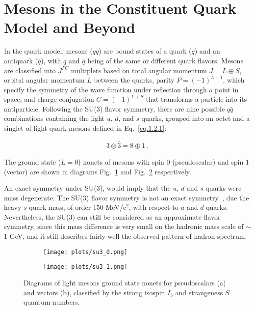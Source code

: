\section{Mesons in the Constituent Quark Model and Beyond}
\label{p.1.2}

In the quark model, mesons ($q\bar{q}$) are bound states of a quark ($q$) and an antiquark ($\bar{q}$), with $q$ and $\bar{q}$ being of the same or different quark flavors. Mesons are classified into $J^{PC}$ multiplets based on  total angular momentum $J = L \oplus S$, orbital angular momentum $L$ between the quarks, parity $P=(-1)^{L+1}$, which specify the symmetry of the wave function under reflection through a point in space, and charge conjugation $C=(-1)^{L+S}$ that transforms a particle into its antiparticle. Following the SU(3) flavor symmetry, there are nine possible $q\bar{q}$ combinations containing the light $u$, $d$, and $s$ quarks, grouped into an octet and a singlet of light quark mesons defined in Eq.~\ref{eq.1.2.1}:

\begin{equation}
    \label{eq.1.2.1}
    \begin{aligned}
        3 \otimes \bar{3} = 8 \oplus 1~.
    \end{aligned}
\end{equation}

The ground state ($L=0$) nonets of mesons with spin 0 (pseudoscalar) and spin 1 (vector) are shown in diagrams Fig.~\ref{fig.1.2.1.a} and Fig.~\ref{fig.1.2.1.b} respectively.
~\par An exact symmetry under SU(3), would imply that the $u$, $d$ and $s$ quarks were mass degenerate. The SU(3) flavor symmetry is not an exact symmetry~\cite{Zweig64}, due the heavy $s$ quark mass, of order 150 MeV/c$^{2}$, with respect to $u$ and $d$ quarks. Nevertheless, the SU(3) can still be considered as an approximate flavor symmetry, since this mass difference is very small on the hadronic mass scale of $\sim$ 1 GeV, and it still describes fairly well the observed pattern of hadron spectrum.

\begin{figure}[H]
    \centering
    \begin{subfigure}[H]{0.5\textwidth}
        \texttt{[image: plots/su3\_0.png]}
        \caption{}
        \label{fig.1.2.1.a}
    \end{subfigure}\hfill
    \begin{subfigure}[H]{0.5\textwidth}
        \texttt{[image: plots/su3\_1.png]}
        \caption{}
        \label{fig.1.2.1.b}
    \end{subfigure}
    \caption{Diagrams of light mesons ground state nonets for pseudoscalars (a) and vectors (b), classified by the strong isospin $I_3$ and strangeness $S$ quantum numbers.}
    \label{fig.1.2.1}
\end{figure}

